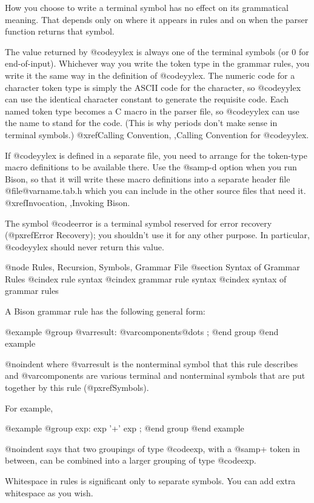 {{{{{{{{{{{{{{{{{{How you choose to write a terminal symbol has no effect on its
grammatical meaning.  That depends only on where it appears in rules and
on when the parser function returns that symbol.

The value returned by @code{yylex} is always one of the terminal symbols
(or 0 for end-of-input).  Whichever way you write the token type in the
grammar rules, you write it the same way in the definition of @code{yylex}.
The numeric code for a character token type is simply the ASCII code for
the character, so @code{yylex} can use the identical character constant to
generate the requisite code.  Each named token type becomes a C macro in
the parser file, so @code{yylex} can use the name to stand for the code.
(This is why periods don't make sense in terminal symbols.)  
@xref{Calling Convention, ,Calling Convention for @code{yylex}}.

If @code{yylex} is defined in a separate file, you need to arrange for the
token-type macro definitions to be available there.  Use the @samp{-d}
option when you run Bison, so that it will write these macro definitions
into a separate header file @file{@var{name}.tab.h} which you can include
in the other source files that need it.  @xref{Invocation, ,Invoking Bison}.

The symbol @code{error} is a terminal symbol reserved for error recovery
(@pxref{Error Recovery}); you shouldn't use it for any other purpose.
In particular, @code{yylex} should never return this value.

@node Rules, Recursion, Symbols, Grammar File
@section Syntax of Grammar Rules
@cindex rule syntax
@cindex grammar rule syntax
@cindex syntax of grammar rules

A Bison grammar rule has the following general form:

@example
@group
@var{result}: @var{components}@dots{}
        ;
@end group
@end example

@noindent
where @var{result} is the nonterminal symbol that this rule describes
and @var{components} are various terminal and nonterminal symbols that
are put together by this rule (@pxref{Symbols}).  

For example,

@example
@group
exp:      exp '+' exp
        ;
@end group
@end example

@noindent
says that two groupings of type @code{exp}, with a @samp{+} token in between,
can be combined into a larger grouping of type @code{exp}.

Whitespace in rules is significant only to separate symbols.  You can add
extra whitespace as you wish.

}}}}}}}}}}}}}}}}}}
